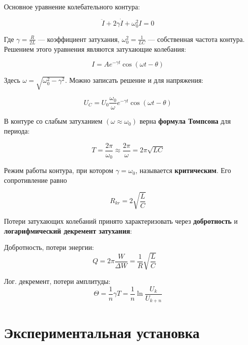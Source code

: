 \documentclass[a4paper,12pt]{article}
\begin{document}
Основное уравнение колебательного контура:

\begin{equation}\label{ddot I}
    \ddot{I} + 2\gamma\dot{I} + \omega_0^2I = 0
\end{equation}

Где ${\gamma = \frac{R}{2L}}$ --- коэффициент затухания, $ \omega_0^2 = \frac{1}{LC} $ --- собственная частота контура. Решением этого уравнения являются затухающие колебания:

\begin{equation}\label{}
I = A e^{-\gamma t} \cos (\omega t - \theta)
\end{equation}

Здесь $ \omega = \sqrt{\omega_0^2 - \gamma^2} $. Можно записать решение и для напряжения:

\begin{equation}\label{}
U_C = U_0 \frac{\omega_0}{\omega} e^{-\gamma t}\cos (\omega t - \theta)
\end{equation}

В контуре со слабым затуханием $ (\omega \approx \omega_0) $ верна \textbf{формула Томпсона} для периода: 

\begin{equation}\label{}
T = \frac{2\pi}{\omega_0} \approx \frac{2\pi}{\omega} = 2\pi\sqrt{LC}
\end{equation}

Режим работы контура, при котором $ \gamma = \omega_0 $, называется \textbf{критическим}. Его сопротивление равно 

\begin{equation}\label{}
R_{kr} = 2\sqrt{\frac{L}{C}}
\end{equation}

Потери затухающих колебаний принято характеризовать через \textbf{добротность} и \textbf{логарифмический декремент затухания}: 

Добротность, потери энергии:
\begin{equation}\label{Q}
Q = 2\pi \frac{W}{\Delta W} = \frac{1}{R} \sqrt{\frac{L}{C}} \quad 
\end{equation}

Лог. декремент, потери амплитуды:
\begin{equation}\label{theta}
\Theta = \frac{1}{n} \gamma T = \frac{1}{n} \ln \frac{U_k}{U_{k+n}}
\end{equation}

\section{Экспериментальная установка}
\end{document}

